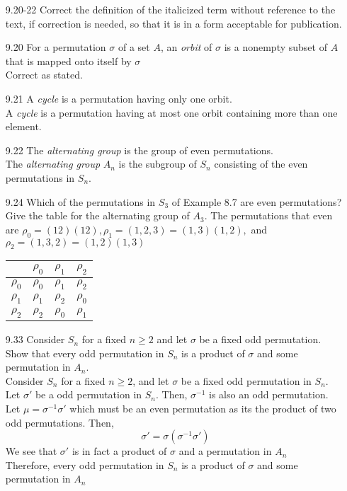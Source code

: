 \documentclass[12pt]{article}
\begin{document}
\begin{enumerate}
\begin{tikzpicture}
	\end{tikzpicture}
	\item[9.20-22] Correct the definition of the italicized term without reference to the text, if correction is needed, so that it is in a form acceptable for publication.
	
	\item[9.20] For a permutation $ \sigma $ of a set $ A $, an \textit{orbit} of $ \sigma $ is a nonempty subset of $ A $ that is mapped onto itself by $ \sigma $\\
	Correct as stated.
	\item[9.21] A \textit{cycle} is a permutation having only one orbit.\\
	A \textit{cycle} is a permutation having at most one orbit containing more than one element.
	\item[9.22] The \textit{alternating group} is the group of even permutations.\\
	The \textit{alternating group} $ A_n $ is the subgroup of $ S_n  $ consisting of the even permutations in $ S_n $.
	\item[9.24] Which of the permutations in $ S_3 $ of Example 8.7 are even permutations? Give the table for the alternating group of $ A_3 $.
	The permutations that even are $ \rho_0=(12)(12),\rho_1=(1,2,3)=(1,3)(1,2), $ and $ \rho_2 = (1,3,2)=(1,2)(1,3) $
	\item[]
	\begin{table}[H]
		\begin{tabular}{|l|l|l|l|}
			\hline
			& \textbf{$\rho_0$} & \textbf{$\rho_1$} & \textbf{$\rho_2$} \\ \hline
			\textbf{$\rho_0$} &$ \rho_0$ & $\rho_1$ & $\rho_2 $\\ \hline
			\textbf{$\rho_1$} &$ \rho_1$ & $\rho_2$ & $\rho_0 $\\ \hline
			\textbf{$\rho_2$} & $\rho_2 $& $\rho_0$ & $\rho_1 $\\ \hline
		\end{tabular}
	\end{table}
	\item[9.33] Consider $ S_n $ for a fixed $ n\geq2 $ and let $ \sigma $ be a fixed odd permutation. Show that every odd permutation in $ S_n $ is a product of $ \sigma $ and some permutation in $ A_n $.\\
	 Consider $ S_n $ for a fixed $ n \geq 2 $, and let $ \sigma $ be a fixed odd permutation in $ S_n $. Let $ \sigma' $ be a odd permutation in $ S_n $. Then, $ \sigma^{-1} $ is also an odd permutation. Let $ \mu = \sigma^{-1}\sigma'$ which must be an even permutation as its the product of two odd permutations. Then, 
	 	\[\sigma' = \sigma(\sigma^{-1}\sigma') \]
	 We see that $ \sigma' $ is in fact a product of $ \sigma $ and a permutation in $ A_n $\\
	 Therefore, every odd permutation in $ S_n $ is a product of $ \sigma $ and some permutation in $ A_n $
	 

\end{enumerate}
\end{document}
